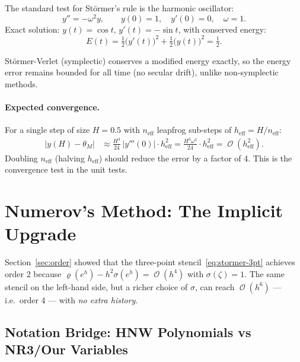 \documentclass[11pt]{article}
\DeclareMathOperator{\OO}{\mathcal{O}}
\begin{document}
The standard test for Störmer's rule is the harmonic oscillator:
\begin{equation}
  y'' = -\omega^2 y, \qquad y(0) = 1,\quad y'(0) = 0,\quad \omega = 1.
\end{equation}
Exact solution: $y(t) = \cos t$, $y'(t) = -\sin t$, with conserved energy:
\begin{equation}
  E(t) = \tfrac{1}{2}\bigl(y'(t)\bigr)^2 + \tfrac{1}{2}\bigl(y(t)\bigr)^2 = \tfrac12.
\end{equation}

Störmer-Verlet (symplectic) conserves a modified energy exactly, so the
energy error remains bounded for all time (no secular drift), unlike non-symplectic
methods.

\paragraph{Expected convergence.}
For a single step of size $H = 0.5$ with $n_\text{eff}$ leapfrog sub-steps of
$h_\text{eff} = H/n_\text{eff}$:
\begin{align*}
  |y(H) - \theta_M| &\approx \tfrac{H^3}{24}\,|y'''(0)|\cdot h_\text{eff}^2
                             = \tfrac{H^3 \omega^3}{24}\cdot h_\text{eff}^2
                             = \OO(h_\text{eff}^2).
\end{align*}
Doubling $n_\text{eff}$ (halving $h_\text{eff}$) should reduce the error by a
factor of 4.  This is the convergence test in the unit tests.

\section{Numerov's Method: The Implicit Upgrade}
\label{sec:numerov}

Section~\ref{sec:order} showed that the three-point stencil~\eqref{eq:stormer-3pt}
achieves order 2 because $\varrho(e^h) - h^2\sigma(e^h) = \OO(h^4)$ with
$\sigma(\zeta) = 1$.  The same stencil on the left-hand side, but a richer
choice of $\sigma$, can reach $\OO(h^6)$ --- i.e.\ order 4 --- with \emph{no
extra history}.

\subsection{Notation Bridge: HNW Polynomials vs NR3/Our Variables}
\label{ssec:notation-bridge}
\end{document}
